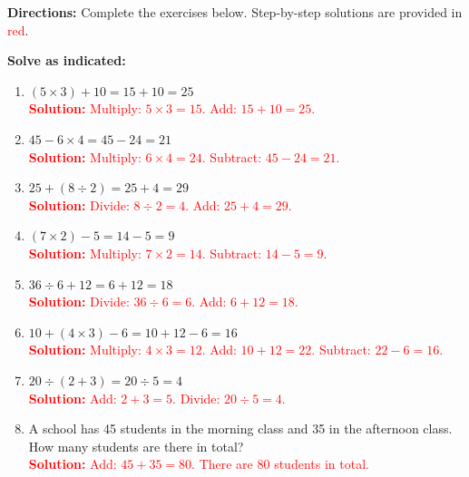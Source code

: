 \documentclass[11pt]{article}
\begin{document}
\begin{tcolorbox}[colframe=black!60, colback=white, 
coltitle=black, colbacktitle=black!15, fonttitle=\bfseries\Large, 
title=Exercises, halign title=center, left=10pt, right=10pt, top=10pt, bottom=60pt]
\textbf{Directions:} Complete the exercises below. Step-by-step solutions are provided in \textcolor{red}{red}.

\textbf{Solve as indicated:}
\begin{enumerate}[itemsep=2em]
    \item \( (5 \times 3) + 10 = 15 + 10 = 25\)\\
    \textcolor{red}{\textbf{Solution:} Multiply: \(5 \times 3 = 15\). Add: \(15 + 10 = 25\).}
    
    \item \( 45 - 6 \times 4 = 45 - 24 = 21\)\\
    \textcolor{red}{\textbf{Solution:} Multiply: \(6 \times 4 = 24\). Subtract: \(45 - 24 = 21\).}
    
    \item \( 25 + (8 \div 2) = 25 + 4 = 29\)\\
    \textcolor{red}{\textbf{Solution:} Divide: \(8 \div 2 = 4\). Add: \(25 + 4 = 29\).}
    
    \item \( (7 \times 2) - 5 = 14 - 5 = 9\)\\
    \textcolor{red}{\textbf{Solution:} Multiply: \(7 \times 2 = 14\). Subtract: \(14 - 5 = 9\).}
    
    \item \( 36 \div 6 + 12 = 6 + 12 = 18\)\\
    \textcolor{red}{\textbf{Solution:} Divide: \(36 \div 6 = 6\). Add: \(6 + 12 = 18\).}
    
    \item \( 10 + (4 \times 3) - 6 = 10 + 12 - 6 = 16\)\\
    \textcolor{red}{\textbf{Solution:} Multiply: \(4 \times 3 = 12\). Add: \(10 + 12 = 22\). Subtract: \(22 - 6 = 16\).}
    
    \item \( 20 \div (2 + 3) = 20 \div 5 = 4\)\\
    \textcolor{red}{\textbf{Solution:} Add: \(2 + 3 = 5\). Divide: \(20 \div 5 = 4\).}
    
    \item A school has 45 students in the morning class and 35 in the afternoon class. How many students are there in total?\\
    \textcolor{red}{\textbf{Solution:} Add: \(45 + 35 = 80\). There are 80 students in total.}
\end{enumerate}
\end{tcolorbox}
\end{document}
